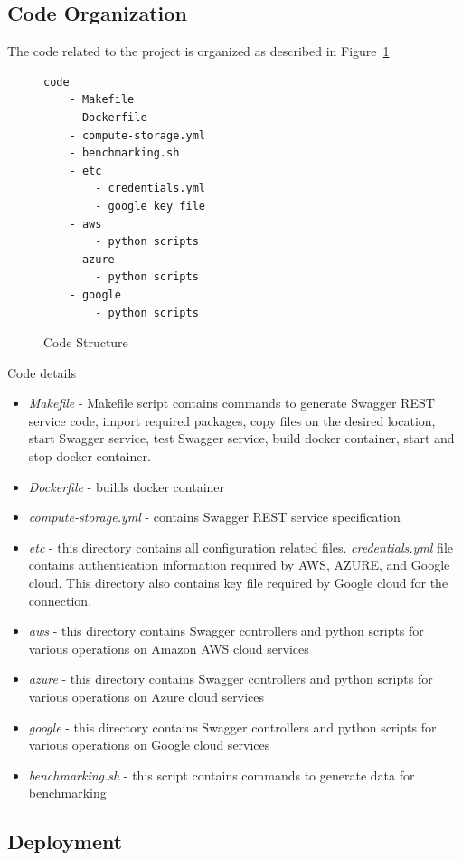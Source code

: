 \subsection{Code Organization}

The code related to the project is organized as described in
Figure~\ref{c:code-structure}
\begin{figure}[htb]
\begin{verbatim}
code
    - Makefile
    - Dockerfile
    - compute-storage.yml
    - benchmarking.sh
    - etc
        - credentials.yml
        - google key file
    - aws
        - python scripts
   -  azure
        - python scripts
    - google
        - python scripts
\end{verbatim}
\caption{Code Structure}\label{c:code-structure}
\end{figure}

Code details
\begin{itemize}
\item \emph{Makefile} - Makefile script contains commands to
generate Swagger REST service code, import required packages,
copy files on the desired location, start Swagger service, test
Swagger service, build docker container, start and stop docker
container.
\item \emph{Dockerfile} - builds docker container
\item \emph{compute-storage.yml} - contains Swagger REST service
specification
\item \emph{etc} - this directory contains all configuration related files.
\emph{credentials.yml} file contains
authentication information required by AWS, AZURE, and Google
cloud. This directory also contains key file required by Google cloud for the
connection.
\item \emph{aws} - this directory contains Swagger controllers 
and python scripts for various operations on Amazon AWS cloud services
\item \emph{azure} - this directory contains Swagger controllers
and python scripts for various operations on Azure cloud services
\item \emph{google} - this directory contains Swagger controllers
and python scripts for various operations on Google cloud services
\item \emph{benchmarking.sh} - this script contains commands to generate data
for benchmarking
\end{itemize}

\subsection{Deployment}

